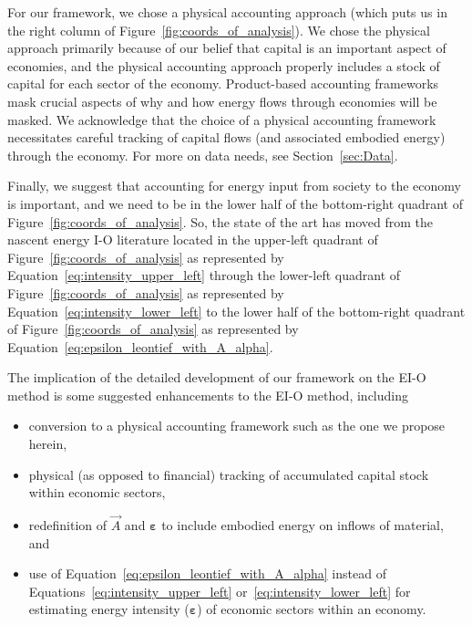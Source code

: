 For our framework, we chose a physical accounting approach
(which puts us in the right column of Figure~\ref{fig:coords_of_analysis}).
We chose the physical approach primarily because of our belief that 
capital is an important aspect of economies,
and the physical accounting approach
properly includes a stock of capital for each sector of the economy.
Product-based accounting frameworks mask crucial aspects 
of why and how energy flows through economies will be masked.
We acknowledge that the choice of a physical accounting framework necessitates
careful tracking of capital flows (and associated embodied energy)
through the economy. 
For more on data needs, see Section~\ref{sec:Data}.

Finally, we suggest that accounting for energy input from society
to the economy is important, 
and we need to be in the lower half of the bottom-right quadrant
of Figure~\ref{fig:coords_of_analysis}.
So, the state of the art has moved from the nascent energy I-O literature
located in the upper-left quadrant of Figure~\ref{fig:coords_of_analysis}
as represented by Equation~\ref{eq:intensity_upper_left}
through the lower-left quadrant of Figure~\ref{fig:coords_of_analysis}
as represented by Equation~\ref{eq:intensity_lower_left}
to the lower half of the bottom-right quadrant 
of Figure~\ref{fig:coords_of_analysis}
as represented by Equation~\ref{eq:epsilon_leontief_with_A_alpha}.

The implication of the detailed development of our framework
on the EI-O method is 
some suggested enhancements to the EI-O method, 
including

\begin{itemize}
	\item{conversion to a physical accounting framework such as the one we propose herein,}
	
	\item{physical (as opposed to financial) tracking 
	of accumulated capital stock within economic sectors,}
	
	\item{redefinition of $\vec{A}$ and $\boldsymbol{\varepsilon}$ to include
	embodied energy on inflows of material, and}
	
	\item{use of Equation~\ref{eq:epsilon_leontief_with_A_alpha} instead of
	Equations~\ref{eq:intensity_upper_left} or~\ref{eq:intensity_lower_left}
	for estimating energy intensity ($\boldsymbol{\varepsilon}$)
	of economic sectors within an economy.}
\end{itemize}
 

